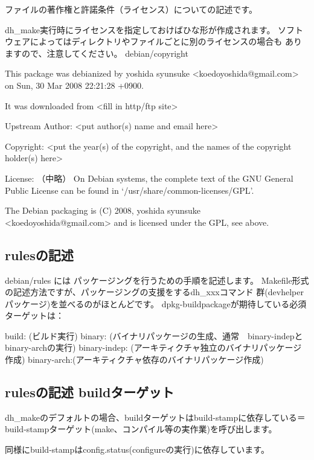 \documentclass[mingoth,a4paper]{jsarticle}
\begin{document}
ファイルの著作権と許諾条件（ライセンス）についての記述です。

dh\_make実行時にライセンスを指定しておけばひな形が作成されます。
ソフトウェアによってはディレクトリやファイルごとに別のライセンスの場合も
ありますので、注意してください。
debian/copyright

\begin{commandline}
 This package was debianized by yoshida syunsuke <koedoyoshida@gmail.com> on
 Sun, 30 Mar 2008 22:21:28 +0900.

 It was downloaded from <fill in http/ftp site>

 Upstream Author: <put author(s) name and email here>

 Copyright: <put the year(s) of the copyright, and the names of the
            copyright holder(s) here>

 License:
 （中略）
 On Debian systems, the complete text of the GNU General
 Public License can be found in `/usr/share/common-licenses/GPL'.

 The Debian packaging is (C) 2008, yoshida syunsuke <koedoyoshida@gmail.com> and
 is licensed under the GPL, see above.
\end{commandline}


\subsection{rulesの記述}
debian/rules
には
パッケージングを行うための手順を記述します。
Makefile形式の記述方法ですが、パッケージングの支援をするdh\_xxxコマンド
群(devhelperパッケージ)を並べるのがほとんどです。
dpkg-buildpackageが期待している必須ターゲットは：

\begin{commandline}
 build: (ビルド実行)
 binary: (バイナリパッケージの生成、通常　binary-indepとbinary-archの実行)
 binary-indep: (アーキティクチャ独立のバイナリパッケージ作成)
 binary-arch:(アーキティクチャ依存のバイナリパッケージ作成)
\end{commandline}

\subsection{rulesの記述 buildターゲット}
dh\_makeのデフォルトの場合、buildターゲットはbuild-stampに依存している＝
build-stampターゲット(make、コンパイル等の実作業)を呼び出します。

同様にbuild-stampはconfig.status(configureの実行)に依存しています。
\end{document}
